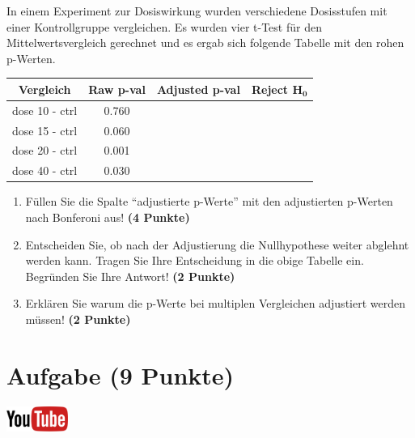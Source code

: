 \documentclass[a4paper, 10pt]{scrartcl}\usepackage[]{graphicx}\usepackage[]{xcolor}
\begin{document}
In einem Experiment zur Dosiswirkung wurden verschiedene Dosisstufen mit
einer Kontrollgruppe vergleichen. Es wurden vier t-Test f{\"u}r den
Mittelwertsvergleich gerechnet und es ergab sich folgende Tabelle mit den
rohen p-Werten.



\begin{center}
  \Large
  \begin{tabular}{c|c|c|c}
    \textbf{Vergleich} & \textbf{Raw p-val} & \textbf{Adjusted p-val} &
                                                                        \textbf{Reject $\boldsymbol{H_0}$} \strut\\
    \hline
    dose 10 - ctrl  & 0.760 &  &\strut\\
    \hline
    dose 15 - ctrl  & 0.060 & &\strut\\
    \hline
    dose 20 - ctrl  & 0.001 & &\strut\\
    \hline
    dose 40 - ctrl  & 0.030 & &\strut\\
  \end{tabular}
\end{center}

\begin{enumerate}
\item F{\"u}llen Sie die Spalte "`adjustierte p-Werte"' mit den adjustierten
  p-Werten nach Bonferoni aus! \textbf{(4 Punkte)}
\item Entscheiden Sie, ob nach der Adjustierung die Nullhypothese weiter
  abglehnt werden kann. Tragen Sie Ihre Entscheidung in die obige Tabelle
  ein. Begr{\"u}nden Sie Ihre Antwort! \textbf{(2 Punkte)}
\item Erkl{\"a}ren Sie warum die p-Werte bei multiplen Vergleichen
  adjustiert werden m{\"u}ssen! \textbf{(2 Punkte)}
\end{enumerate}

\vspace{1Ex}

 
\clearpage

\section{Aufgabe \hfill (9 Punkte)}

 \hfill\href{https://youtu.be/RagTFFKFbFg}{\includegraphics[width =
   2cm]{img/youtube}}\\[1Ex]
\end{document}
